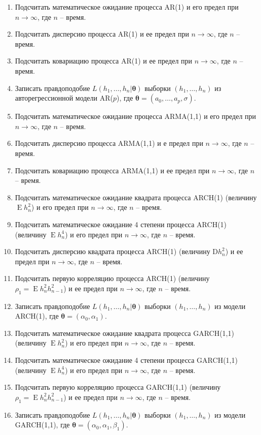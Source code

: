 \documentclass[a4paper,12pt]{extreport}
\renewcommand{\=}[1]{\stackrel{#1}{=}} %
\newcommand{\Expect}{\mathop{{}\mathrm{E}}}
\begin{document}
\begin{enumerate}
	\item Подсчитать математическое ожидание процесса AR(1) и его предел при $n \to \infty$,
	где $n$ -- время. 
	\item Подсчитать дисперсию процесса AR(1) и ее предел при $n \to \infty$,
	где $n$ -- время. 
	\item Подсчитать ковариацию процесса AR(1) и ее предел при $n \to \infty$,
	где $n$ -- время.

	\item Записать правдоподобие $L(h_1, \ldots, h_n | \bm{\theta})$
	выборки $(h_1, \ldots, h_n)$ из
	авторегрессионной модели AR($p$), где $\bm{\theta} = (a_0, \ldots, a_p, \sigma)$.

	\item Подсчитать математическое ожидание процесса ARMA(1,1) и его предел при $n \to \infty$,
	где $n$ -- время. 
	\item Подсчитать дисперсию процесса ARMA(1,1) и е предел при $n \to \infty$,
	где $n$ -- время. 
	\item Подсчитать ковариацию процесса ARMA(1,1) и ее предел при $n \to \infty$,
	где $n$ -- время.

	\item Подсчитать математическое ожидание квадрата процесса ARCH(1)
	(величину $\Expect h^2_n$)
	и его предел при $n \to \infty$, где $n$ -- время. 
	\item Подсчитать математическое ожидание 4 степени процесса ARCH(1)
	(величину $\Expect h^4_n$)
	и его предел при $n \to \infty$, где $n$ -- время. 
	\item Подсчитать дисперсию квадрата процесса ARCH(1)
	(величину $\mathrm{D} h^2_n$)
	и ее предел при $n \to \infty$, где $n$ -- время. 
	\item Подсчитать первую корреляцию процесса ARCH(1)
	(величину $\rho_1 = \Expect h^2_n h^2_{n - 1}$)
	и ее предел при $n \to \infty$, где $n$ -- время. 
	\item Записать правдоподобие $L(h_1, \ldots, h_n | \bm{\theta})$
	выборки $(h_1, \ldots, h_n)$ из
	модели ARCH(1), где $\bm{\theta} = (\alpha_0, \alpha_1)$.

	\item Подсчитать математическое ожидание квадрата процесса GARCH(1,1)
	(величину $\Expect h^2_n$)
	и его предел при $n \to \infty$, где $n$ -- время. 
	\item Подсчитать математическое ожидание 4 степени процесса GARCH(1,1)
	(величину $\Expect h^4_n$)
	и его предел при $n \to \infty$, где $n$ -- время. 
	\item Подсчитать первую корреляцию процесса GARCH(1,1)
	(величину $\rho_1 = \Expect h^2_n h^2_{n - 1}$)
	и ее предел при $n \to \infty$, где $n$ -- время. 
	\item Записать правдоподобие $L(h_1, \ldots, h_n | \bm{\theta})$
	выборки $(h_1, \ldots, h_n)$ из
	модели GARCH(1,1), где $\bm{\theta} = (\alpha_0, \alpha_1, \beta_1)$.


\end{enumerate}
\end{document}

